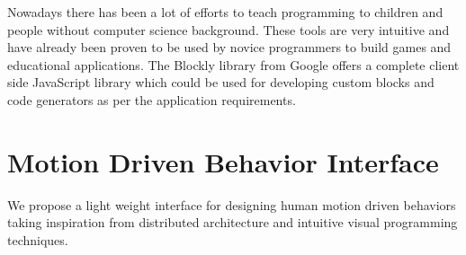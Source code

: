 \documentclass{llncs}
\begin{document}
	Nowadays there has been a lot of efforts to teach programming to children and people without computer science background\cite{Scratch}\cite{Blockly}. These tools are very intuitive and have already been proven to be used by novice programmers to build games and educational applications. The Blockly library\cite{Blockly} from Google offers a complete client side JavaScript library which could be used for developing custom blocks and code generators as per the application requirements.
\section{Motion Driven Behavior Interface}
We propose a light weight interface for designing human motion driven behaviors taking inspiration from distributed architecture\cite{quigley2009ros} and intuitive visual programming techniques\cite{Blockly}. 
\end{document}
